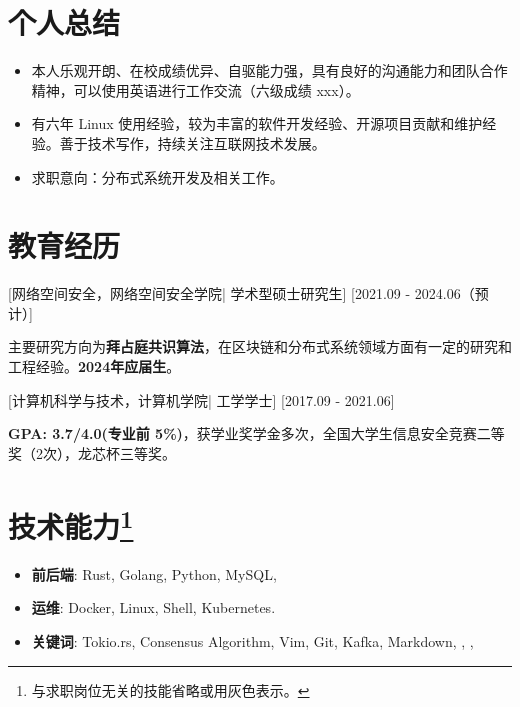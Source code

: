 \documentclass{resume}
\begin{document}

\ResumeTitle

\section{个人总结}

\begin{itemize}
  \item 本人乐观开朗、在校成绩优异、自驱能力强，具有良好的沟通能力和团队合作精神，可以使用英语进行工作交流（六级成绩 xxx）。
  \item 有六年 Linux 使用经验，较为丰富的软件开发经验、开源项目贡献和维护经验。善于技术写作，持续关注互联网技术发展。
  \item 求职意向：分布式系统开发及相关工作。
\end{itemize}

\section{教育经历}
[\textnormal{网络空间安全，网络空间安全学院|}  学术型硕士研究生]
[2021.09 - 2024.06（预计）]

主要研究方向为\textbf{拜占庭共识算法}，在区块链和分布式系统领域方面有一定的研究和工程经验。\textbf{2024年应届生}。

[\textnormal{计算机科学与技术，计算机学院|} 工学学士]
[2017.09 - 2021.06]

\textbf{GPA: 3.7/4.0(专业前 5\%)}，获学业奖学金多次，全国大学生信息安全竞赛二等奖（2次），龙芯杯三等奖。


\section[技术能力]{技术能力\protect\footnote{与求职岗位无关的技能省略或用灰色表示。}}
\begin{itemize}
  \item \textbf{前后端}: Rust, Golang, Python, MySQL, 
  \item \textbf{运维}: Docker, Linux, Shell, Kubernetes.
  \item \textbf{关键词}: Tokio.rs, Consensus Algorithm, Vim, Git, Kafka, Markdown, , \GrayText{\LaTeX}, 
\end{itemize}
\end{document}
